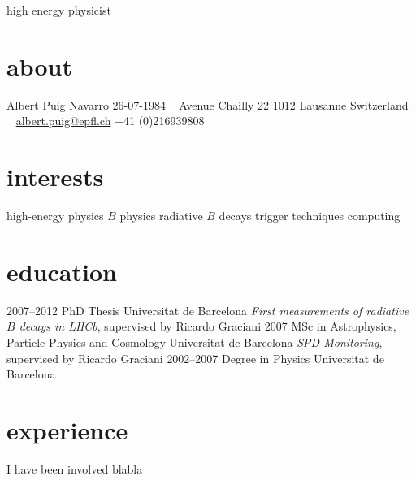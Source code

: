 \documentclass[]{friggeri-cv}
\begin{document}
       {high energy physicist}


\begin{aside}
  \section{about}
    Albert Puig Navarro
    26-07-1984
    ~
    Avenue Chailly 22
    1012 Lausanne
    Switzerland
    ~
    \href{mailto:albert.puig@epfl.ch}{albert.puig@epfl.ch}
    +41 (0)216939808
   \section{interests}
    high-energy physics
    $B$ physics
    radiative $B$ decays
    trigger techniques
    computing
\end{aside}

\section{education}

\begin{entrylist}
  \entry
    {2007--2012}
    {PhD Thesis}
    {Universitat de Barcelona}
    {\emph{First measurements of radiative $B$ decays in LHCb}, supervised by Ricardo Graciani}
  \entry
    {2007}
    {MSc in Astrophysics, Particle Physics and Cosmology}
    {Universitat de Barcelona}
    {\emph{SPD Monitoring}, supervised by Ricardo Graciani}
  \entry
    {2002--2007}
    {Degree in Physics}
    {Universitat de Barcelona}
    {}
\end{entrylist}

\section{experience}
I have been involved blabla
\end{document}
